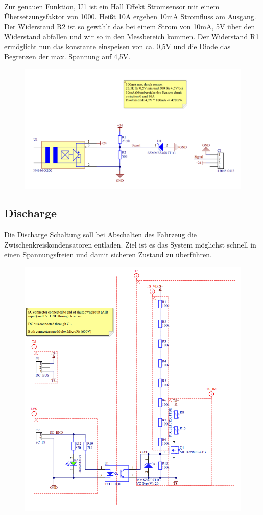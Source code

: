 Zur genauen Funktion, U1 ist ein Hall Effekt Stromsensor mit einem Übersetzungsfaktor von 1000. Heißt 10A ergeben 10mA Stromfluss am Ausgang. Der Widerstand R2 ist so gewählt das bei einem Strom von 10mA, 5V über den Widerstand abfallen und wir so in den Messbereich kommen. Der Widerstand R1 ermöglicht nun das konstante einspeisen von ca. 0,5V und die Diode das Begrenzen der max. Spannung auf 4,5V.

\begin{figure}
	\centering
	\includegraphics[width=0.7\linewidth]{"bilder/Sensorboard Schaltung"}
	\caption{}
	\label{fig:sensorboard-schaltung}
\end{figure}

\FloatBarrier
\subsection{Discharge}
Die Discharge Schaltung soll bei Abschalten des Fahrzeug die Zwischenkreiskondensatoren entladen. Ziel ist es das System möglichst schnell in einen Spannungsfreien und damit sicheren Zustand zu überführen.
\begin{figure}
	\centering
	\includegraphics[width=0.7\linewidth]{bilder/Discharge}
	\caption{}
	\label{fig:discharge}
\end{figure}

